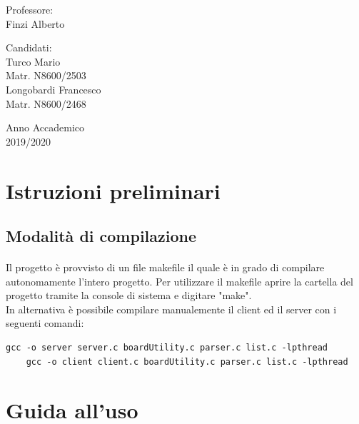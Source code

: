 \documentclass[a4paper]{article}
\begin{document}
\begin{titlepage}
\begin{center}
  \begin{multicols}{1}
    {\large Professore:\\}
    Finzi Alberto\
    \vspace{5mm}
    
    
      \vspace{5mm}
    
    {\large Candidati:\\}
    Turco Mario\\
    Matr. N8600/2503\\
    Longobardi Francesco\\
    Matr. N8600/2468\\
    \vspace{10mm}
  \end{multicols}
  
  \vfill
  
  {\large Anno Accademico\\ 2019/2020}
  
  \end{center}
  

\end{titlepage}

\thispagestyle{empty}\null\newpage
\tableofcontents
\newpage
{}
\section{Istruzioni preliminari}
\subsection{Modalità di compilazione}
\paragraph{}
Il progetto è provvisto di un file makefile il quale è in grado di compilare autonomamente l'intero progetto.
Per utilizzare il makefile aprire la cartella del progetto tramite la console di sistema e digitare "make".\\
In alternativa è possibile compilare manualemente il client ed il server con i seguenti comandi:
\begin{Verbatim}[fontsize=\small]
    gcc -o server server.c boardUtility.c parser.c list.c -lpthread
    gcc -o client client.c boardUtility.c parser.c list.c -lpthread
\end{Verbatim}
\section{Guida all'uso }
\end{document}
